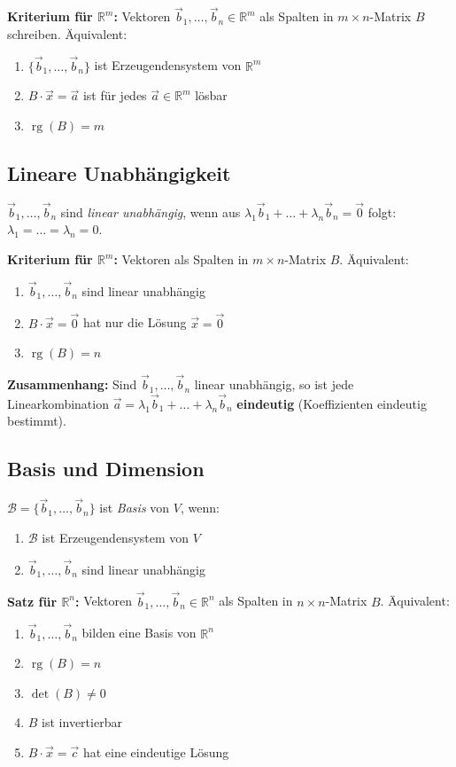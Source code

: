 \textbf{Kriterium für $\mathbb{R}^m$:} Vektoren $\vec{b}_1, \ldots, \vec{b}_n \in \mathbb{R}^m$ als Spalten in $m \times n$-Matrix $B$ schreiben. Äquivalent:
\begin{enumerate}
    \item $\{\vec{b}_1, \ldots, \vec{b}_n\}$ ist Erzeugendensystem von $\mathbb{R}^m$
    \item $B \cdot \vec{x} = \vec{a}$ ist für jedes $\vec{a} \in \mathbb{R}^m$ lösbar
    \item $\operatorname{rg}(B) = m$
\end{enumerate}

\subsection{Lineare Unabhängigkeit}
$\vec{b}_1, \ldots, \vec{b}_n$ sind \emph{linear unabhängig}, wenn aus $\lambda_1 \vec{b}_1 + \ldots + \lambda_n \vec{b}_n = \vec{0}$ folgt: $\lambda_1 = \ldots = \lambda_n = 0$.

\textbf{Kriterium für $\mathbb{R}^m$:} Vektoren als Spalten in $m \times n$-Matrix $B$. Äquivalent:
\begin{enumerate}
    \item $\vec{b}_1, \ldots, \vec{b}_n$ sind linear unabhängig
    \item $B \cdot \vec{x} = \vec{0}$ hat nur die Lösung $\vec{x} = \vec{0}$
    \item $\operatorname{rg}(B) = n$
\end{enumerate}

\textbf{Zusammenhang:} Sind $\vec{b}_1, \ldots, \vec{b}_n$ linear unabhängig, so ist jede Linearkombination $\vec{a} = \lambda_1 \vec{b}_1 + \ldots + \lambda_n \vec{b}_n$ \textbf{eindeutig} (Koeffizienten eindeutig bestimmt).

\subsection{Basis und Dimension}
$\mathcal{B} = \{\vec{b}_1, \ldots, \vec{b}_n\}$ ist \emph{Basis} von $V$, wenn:
\begin{enumerate}
    \item $\mathcal{B}$ ist Erzeugendensystem von $V$
    \item $\vec{b}_1, \ldots, \vec{b}_n$ sind linear unabhängig
\end{enumerate}

\textbf{Satz für $\mathbb{R}^n$:} Vektoren $\vec{b}_1, \ldots, \vec{b}_n \in \mathbb{R}^n$ als Spalten in $n \times n$-Matrix $B$. Äquivalent:
\begin{enumerate}
    \item $\vec{b}_1, \ldots, \vec{b}_n$ bilden eine Basis von $\mathbb{R}^n$
    \item $\operatorname{rg}(B) = n$
    \item $\det(B) \neq 0$
    \item $B$ ist invertierbar
    \item $B \cdot \vec{x} = \vec{c}$ hat eine eindeutige Lösung
\end{enumerate}

